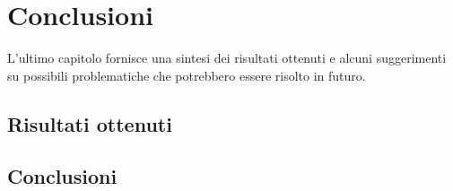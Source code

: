 \chapter{Conclusioni}
\label{Cha:conclusioni}
\thispagestyle{empty}

L'ultimo capitolo fornisce una sintesi dei risultati ottenuti e alcuni suggerimenti su possibili problematiche che potrebbero essere risolto in futuro.

\section{Risultati ottenuti}







\section{Conclusioni}


